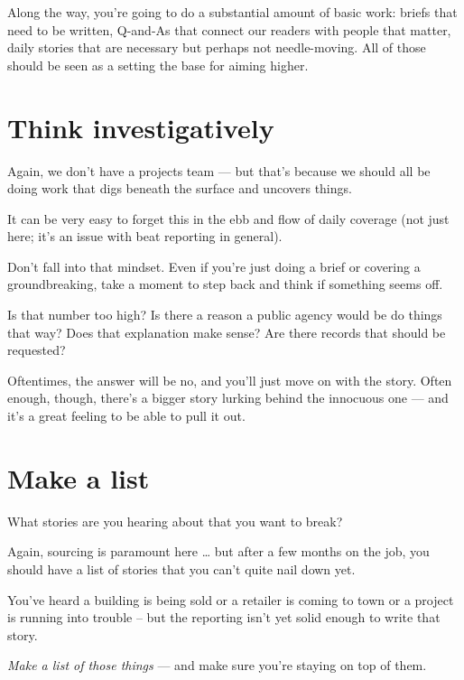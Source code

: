 \documentclass[
  12pt,
  american,
  letterpaperpaper,
  extrafontsizes,onecolumn,openright
  ]{memoir}
\newlength{\rf}
\begin{document}
Along the way, you're going to do a substantial amount of basic work: briefs that need to be written, Q-and-As that connect our readers with people that matter, daily stories that are necessary but perhaps not needle-moving. All of those should be seen as a setting the base for aiming higher.

\hypertarget{think-investigatively}{%
\section*{Think investigatively}\label{think-investigatively}}

Again, we don't have a projects team --- but that's because we should all be doing work that digs beneath the surface and uncovers things.

It can be very easy to forget this in the ebb and flow of daily coverage (not just here; it's an issue with beat reporting in general).

Don't fall into that mindset. Even if you're just doing a brief or covering a groundbreaking, take a moment to step back and think if something seems off.

Is that number too high? Is there a reason a public agency would be do things that way? Does that explanation make sense? Are there records that should be requested?

Oftentimes, the answer will be no, and you'll just move on with the story. Often enough, though, there's a bigger story lurking behind the innocuous one --- and it's a great feeling to be able to pull it out.

\hypertarget{make-a-list}{%
\section*{Make a list}\label{make-a-list}}

What stories are you hearing about that you want to break?

Again, sourcing is paramount here \ldots{} but after a few months on the job, you should have a list of stories that you can't quite nail down yet.

You've heard a building is being sold or a retailer is coming to town or a project is running into trouble -- but the reporting isn't yet solid enough to write that story.

\emph{Make a list of those things} --- and make sure you're staying on top of them.
\end{document}
